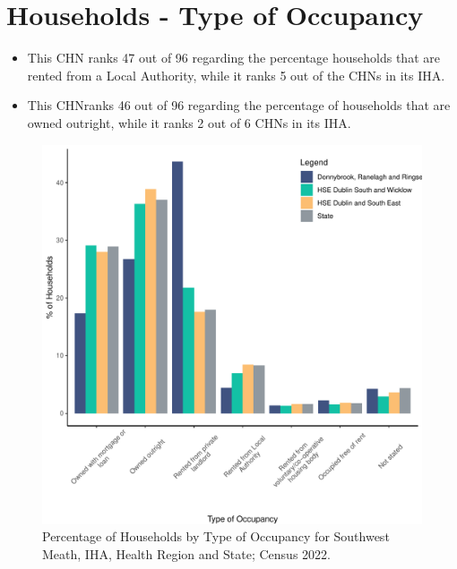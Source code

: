 \documentclass{article}
\begin{document}
\section{Households - Type of Occupancy}\label{sect:Households}
\begin{itemize}
\item This CHN ranks  47 out of 96 regarding the percentage households that are rented from a Local Authority, while it ranks  5 out of the CHNs in its IHA. 
\item This CHNranks  46 out of 96 regarding the percentage of households that are owned outright, while it ranks   2 out of 6 CHNs in its IHA.
\end{itemize}
\begin{figure}[H]
	\centering
	\includegraphics[width = 140mm]{../figures/HouseholdsED.pdf}
	\caption{Percentage of Households by Type of Occupancy for Southwest Meath, IHA, Health Region and State; Census 2022.}
	\label{fig:vbnv}
	\end{figure}
\end{document}
